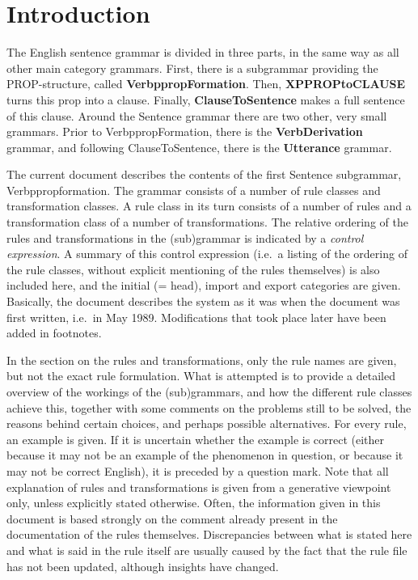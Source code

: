 

   \RosSupersedes{-}
   \MakeRosTitle
%
%
\section{Introduction}
The English sentence grammar is divided in three parts, in the same way as all
other main category grammars. First, there is a subgrammar providing the 
PROP-structure, 
called {\bf VerbppropFormation}. Then, {\bf XPPROPtoCLAUSE} turns this prop
into a clause. Finally, {\bf ClauseToSentence} makes a full sentence of this
clause. Around the Sentence grammar there are two other, very small grammars.
Prior to VerbppropFormation, there is the {\bf VerbDerivation} grammar, and
following ClauseToSentence, there is the {\bf Utterance} grammar.

The current document describes the contents of 
the first Sentence subgrammar, Verbppropformation. The grammar consists of 
a number of rule classes and transformation classes. A rule class in its turn
consists of a number of rules and a transformation class of a number of 
transformations. The relative ordering of the rules and transformations in the
(sub)grammar is indicated by a {\em control expression}. A summary of this 
control expression (i.e.\ a listing of the ordering of the rule classes, 
without explicit mentioning of the rules themselves) is also included here, 
and the initial (= head), import and export categories are given. Basically, 
the document describes the system as it was when the document was first 
written, i.e.\ in May 1989. Modifications that took place later have been added 
in footnotes.

In the section on the rules and transformations, only the rule names 
are given, but not the exact rule formulation. What is attempted 
is to provide a detailed overview of the workings of the (sub)grammars, and 
how the different rule classes achieve this,
together with some comments on the problems still to be solved, the reasons 
behind certain choices, and perhaps possible alternatives. For every rule, an 
example is given. If it is uncertain whether the example is correct (either 
because it may not be an example of the phenomenon in question, or because it 
may not be correct English), it is preceded by a question mark. Note that all 
explanation of rules and transformations is given from a generative viewpoint 
only, unless explicitly stated otherwise. Often, the information given in this 
document is based strongly on the comment already present in the documentation
of the rules themselves. Discrepancies between what is stated here and what is 
said in the rule itself are usually caused by the fact that the rule file has 
not been updated, although insights have changed.

